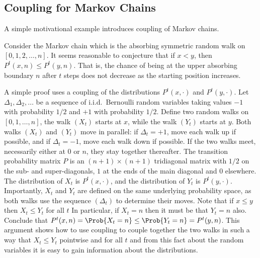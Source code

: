 \documentclass[12pt]{article}
\begin{document}
\subsection*{Coupling for Markov Chains}

A simple motivational example introduces coupling of Markov chains.

\begin{example}
    Consider the Markov chain which is the absorbing symmetric random
    walk on \( [0,1,2,\dots, n] \).  It seems reasonable to conjecture
    that if \( x < y \), then \( P^t(x,n) \le P^t(y, n) \).  That is,
    the chance of being at the upper absorbing boundary \( n \) after \(
    t \) steps does not decrease as the starting position increases.

    A simple proof uses a coupling of the distributions \( P^t(x, \cdot)
    \) and \( P^t(y, \cdot) \).  Let \( \Delta_1, \Delta_2, \dots \) be
    a sequence of i.i.d.\ Bernoulli random variables taking values \( -1
    \) with probability \( 1/2 \) and \( +1 \) with probability \( 1/2 \).
    Define two random walks on \( [0, 1, \dots, n] \), the walk \( (X_t)
    \) starts at \( x \), while the walk \( (Y_{t}) \) starts at \( y \).
    Both walks \( (X_t) \) and \( (Y_t) \) move in parallel:  if \(
    \Delta_t = +1 \), move each walk up if possible, and if \( \Delta_t
    = -1 \), move each walk down if possible.  If the two walks meet,
    necessarily either at \( 0 \) or \( n \), they stay together
    thereafter.  The transition probability matrix \( P \) is an \( (n+1)
    \times (n+1) \) tridiagonal matrix with \( 1/2 \) on the sub- and
    super-diagonals, \( 1 \) at the ends of the main diagonal and \( 0 \)
    elsewhere.  The distribution of \( X_t \) is \( P^t(x, \cdot) \),
    and the distribution of \( Y_t \) is \( P^t(y, \cdot) \).
    Importantly, \( X_t \) and \( Y_t \) are defined on the same
    underlying probability space, as both walks use the sequence \( (\Delta_t)
    \) to determine their moves.  Note that if \( x \le y \) then \( X_t
    \le Y_t \) for all \( t \) In particular, if \( X_t = n \) then it
    must be that \( Y_t = n \) also.  Conclude that \( P^t(x, n) = \Prob
    {X_t = n} \le \Prob{Y_t = n} = P^t(y, n) \).  This argument shows
    how to use coupling to couple together the two walks in such a way
    that \( X_t \le Y_t \) pointwise and for all \( t \) and from this
    fact about the random variables it is easy to gain information about
    the distributions.
\end{example}
\end{document}

